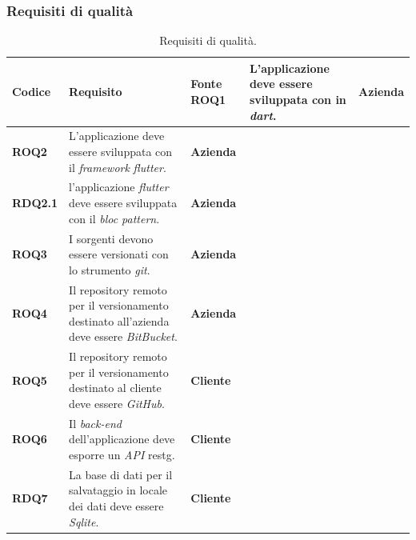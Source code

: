 \subsubsection{Requisiti di qualità}
\begin{longtable}{ |p{2cm}|p{8cm}|p{2cm}|  }
    \caption{Requisiti di qualità.}
    \label{tab:req-qualita}
    \hline
    \textbf{Codice} & \textbf{Requisito} & \textbf{Fonte}
    \hline
    \textbf{ROQ1} & L'applicazione deve essere sviluppata con in \textit{dart}. & \textbf{Azienda} \\ \hline
    \textbf{ROQ2} & L'applicazione deve essere sviluppata con il \textit{framework} \textit{flutter}. & \textbf{Azienda} \\ \hline
    \textbf{RDQ2.1} & l'applicazione \textit{flutter} deve essere sviluppata con il \textit{bloc pattern}. & \textbf{Azienda} \\ \hline
    \textbf{ROQ3} & I sorgenti devono essere versionati con lo strumento \textit{git}. & \textbf{Azienda} \\ \hline
    \textbf{ROQ4} & Il repository remoto per il versionamento destinato all'azienda deve essere \textit{BitBucket}. & \textbf{Azienda} \\ \hline
    \textbf{ROQ5} & Il repository remoto per il versionamento destinato al cliente deve essere \textit{GitHub}. & \textbf{Cliente} \\ \hline
    \textbf{ROQ6} & Il \textit{back-end} dell'applicazione deve esporre un \textit{API} \gls{restg}. & \textbf{Cliente} \\ \hline
    \textbf{RDQ7} & La base di dati per il salvataggio in locale dei dati deve essere \textit{Sqlite}.  & \textbf{Cliente} \\ \hline
\end{longtable}


